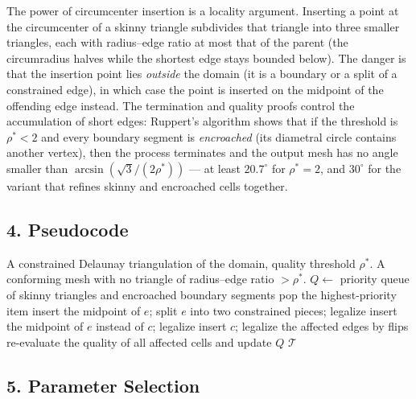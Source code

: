 The power of circumcenter insertion is a locality argument. Inserting a
point at the circumcenter of a skinny triangle subdivides that triangle into
three smaller triangles, each with radius--edge ratio at most that of the
parent (the circumradius halves while the shortest edge stays bounded
below). The danger is that the insertion point lies \emph{outside} the
domain (it is a boundary or a split of a constrained edge), in which case
the point is inserted on the midpoint of the offending edge instead. The
termination and quality proofs control the accumulation of short edges:
Ruppert's algorithm \cite{ruppert1995} shows that if the threshold is
$\rho^* < 2$ and every boundary segment is \emph{encroached} (its
diametral circle contains another vertex), then the process terminates and
the output mesh has no angle smaller than $\arcsin(\sqrt{3}/(2\rho^*))$
--- at least $20.7^\circ$ for $\rho^* = 2$, and $30^\circ$ for the variant
that refines skinny and encroached cells together.

\subsection{4. Pseudocode}

\begin{algorithm}[htbp]
\caption{Delaunay Refinement (Ruppert--Chew style)}
\label{alg:meshgen_refinement}
\begin{algorithmic}[1]
\Require A constrained Delaunay triangulation of the domain, quality threshold $\rho^*$.
\Ensure A conforming mesh with no triangle of radius--edge ratio $> \rho^*$.
  \State $Q \gets$ priority queue of skinny triangles and encroached boundary segments
    \State pop the highest-priority item
      \State insert the midpoint of $e$; split $e$ into two constrained pieces; legalize
      \State insert the midpoint of $e$ instead of $c$; legalize
    \Else
      \State insert $c$; legalize the affected edges by flips
    \EndIf
    \State re-evaluate the quality of all affected cells and update $Q$
  \EndWhile
  \State \Return $\mathcal{T}$
\EndFunction
\end{algorithmic}
\end{algorithm}

\subsection{5. Parameter Selection}

